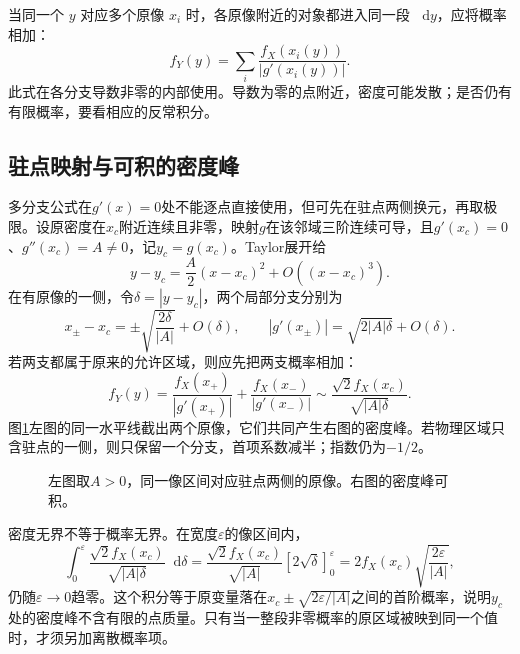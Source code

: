\documentclass[11pt,openany,fontset=fandol]{ctexbook}
\theoremstyle{definition}\newtheorem{example}{例}[chapter]\newtheorem{exercise}{习题}[chapter]
\newcommand{\dd}{\mathop{}\!\mathrm d}\newcommand{\ee}{\mathrm e}\newcommand{\vct}[1]{\bm{#1}}
\begin{document}
当同一个 $y$ 对应多个原像 $x_i$ 时，各原像附近的对象都进入同一段 $\dd y$，应将概率相加：
\begin{equation}\label{mp1:eq:transform-many}
f_Y(y)=\sum_{i}\frac{f_X(x_i(y))}{|g'(x_i(y))|}.
\end{equation}
此式在各分支导数非零的内部使用。导数为零的点附近，密度可能发散；是否仍有有限概率，要看相应的反常积分。


\subsection{驻点映射与可积的密度峰}
多分支公式在$g'(x)=0$处不能逐点直接使用，但可先在驻点两侧换元，再取极限。设原密度在$x_c$附近连续且非零，映射$g$在该邻域三阶连续可导，且$g'(x_c)=0$、$g''(x_c)=A\ne0$，记$y_c=g(x_c)$。Taylor展开给
\[y-y_c=\frac A2(x-x_c)^2+O((x-x_c)^3).
\]
在有原像的一侧，令$\delta=|y-y_c|$，两个局部分支分别为
\[x_\pm-x_c=\pm\sqrt{\frac{2\delta}{|A|}}+O(\delta),
\qquad |g'(x_\pm)|=\sqrt{2|A|\delta}+O(\delta).
\]
若两支都属于原来的允许区域，则应先把两支概率相加：
\[f_Y(y)=\frac{f_X(x_+)}{|g'(x_+)|}
+\frac{f_X(x_-)}{|g'(x_-)|}
\sim\frac{\sqrt2 f_X(x_c)}{\sqrt{|A|\delta}}.
\]
图\ref{mp1:fig:series-density-fold}左图的同一水平线截出两个原像，它们共同产生右图的密度峰。若物理区域只含驻点的一侧，则只保留一个分支，首项系数减半；指数仍为$-1/2$。

\begin{figure}[H]\centering
{}
\caption{左图取$A>0$，同一像区间对应驻点两侧的原像。右图的密度峰可积。}\label{mp1:fig:series-density-fold}
\end{figure}

密度无界不等于概率无界。在宽度$\varepsilon$的像区间内，
\[\int_0^\varepsilon\frac{\sqrt2f_X(x_c)}{\sqrt{|A|\delta}}\dd\delta
=\frac{\sqrt2f_X(x_c)}{\sqrt{|A|}}[2\sqrt\delta]_0^\varepsilon
=2f_X(x_c)\sqrt{\frac{2\varepsilon}{|A|}},
\]
仍随$\varepsilon\to0$趋零。这个积分等于原变量落在$x_c\pm\sqrt{2\varepsilon/|A|}$之间的首阶概率，说明$y_c$处的密度峰不含有限的点质量。只有当一整段非零概率的原区域被映到同一个值时，才须另加离散概率项。
\end{document}
